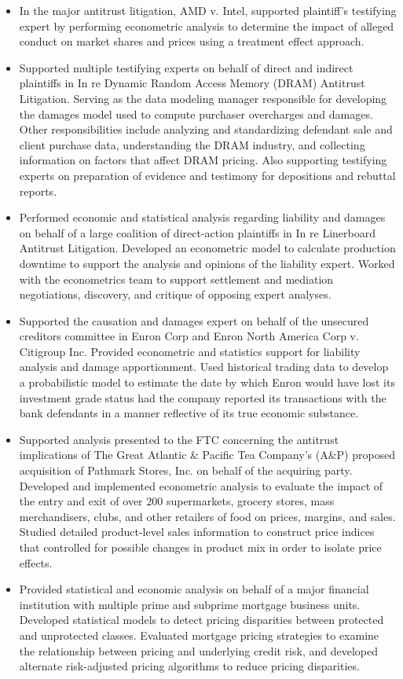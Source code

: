 \documentclass[12pt]{article}
\begin{document}
	\begin{itemize}
		\item In the major antitrust litigation, AMD v. Intel, supported plaintiff’s testifying expert by performing econometric analysis to determine the impact of alleged conduct on market shares and prices using a treatment effect approach.
\item Supported multiple testifying experts on behalf of direct and indirect plaintiffs in In re Dynamic Random Access Memory (DRAM) Antitrust Litigation. Serving as the data modeling manager responsible for developing the damages model used to compute purchaser overcharges and damages. Other responsibilities include analyzing and standardizing defendant sale and client purchase data, understanding the DRAM industry, and collecting information on factors that affect DRAM pricing. Also supporting testifying experts on preparation of evidence and testimony for depositions and rebuttal reports.
\item Performed economic and statistical analysis regarding liability and damages on behalf of a large coalition of direct-action plaintiffs in In re Linerboard Antitrust Litigation. Developed an econometric model to calculate production downtime to support the analysis and opinions of the liability expert. Worked with the econometrics team to support settlement and mediation negotiations, discovery, and critique of opposing expert analyses.
\item Supported the causation and damages expert on behalf of the unsecured creditors committee in Enron Corp and Enron North America Corp v. Citigroup Inc. Provided econometric and statistics support for liability analysis and damage apportionment. Used historical trading data to develop a probabilistic model to estimate the date by which Enron would have lost its investment grade status had the company reported its transactions with the bank defendants in a manner reflective of its true economic substance. 
\item Supported analysis presented to the FTC concerning the antitrust implications of The Great Atlantic & Pacific Tea Company’s (A&P) proposed acquisition of Pathmark Stores, Inc. on behalf of the acquiring party. Developed and implemented econometric analysis to evaluate the impact of the entry and exit of over 200 supermarkets, grocery stores, mass merchandisers, clubs, and other retailers of food on prices, margins, and sales. Studied detailed product-level sales information to construct price indices that controlled for possible changes in product mix in order to isolate price effects.
\item Provided statistical and economic analysis on behalf of a major financial institution with multiple prime and subprime mortgage business units. Developed statistical models to detect pricing disparities between protected and unprotected classes. Evaluated mortgage pricing strategies to examine the relationship between pricing and underlying credit risk, and developed alternate risk-adjusted pricing algorithms to reduce pricing disparities.

	\end{itemize}
\end{document}
